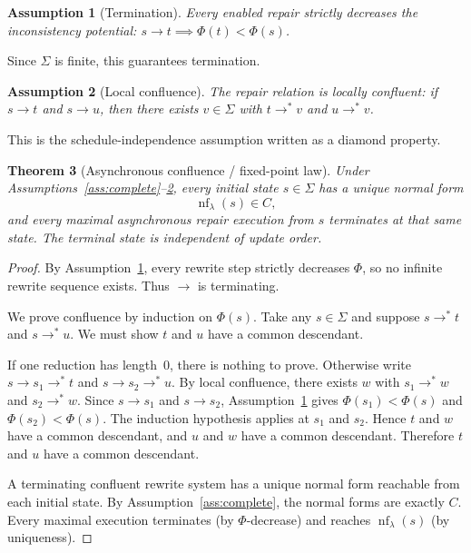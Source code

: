 \documentclass[11pt]{article}
\newtheorem{theorem}{Theorem}[section]
\newtheorem{assumption}[theorem]{Assumption}
\begin{document}
\begin{assumption}[Termination]\label{ass:termination}
Every enabled repair strictly decreases the inconsistency potential: $s\to t \implies \Phi(t)<\Phi(s)$.
\end{assumption}

Since $\Sigma$ is finite, this guarantees termination.

\begin{assumption}[Local confluence]\label{ass:confluence}
The repair relation is locally confluent: if $s\to t$ and $s\to u$, then there exists $v\in\Sigma$ with $t\to^* v$ and $u\to^* v$.
\end{assumption}

This is the schedule-independence assumption written as a diamond property.

\begin{theorem}[Asynchronous confluence / fixed-point law]\label{thm:confluence}
Under Assumptions~\ref{ass:complete}--\ref{ass:confluence}, every initial state $s\in\Sigma$ has a unique normal form
\[
\operatorname{nf}_\lambda(s)\in C,
\]
and every maximal asynchronous repair execution from $s$ terminates at that same state. The terminal state is independent of update order.
\end{theorem}

\begin{proof}
By Assumption~\ref{ass:termination}, every rewrite step strictly decreases $\Phi$, so no infinite rewrite sequence exists. Thus $\to$ is terminating.

We prove confluence by induction on $\Phi(s)$. Take any $s\in\Sigma$ and suppose $s\to^* t$ and $s\to^* u$. We must show $t$ and $u$ have a common descendant.

If one reduction has length~0, there is nothing to prove. Otherwise write $s\to s_1\to^* t$ and $s\to s_2\to^* u$. By local confluence, there exists $w$ with $s_1\to^* w$ and $s_2\to^* w$. Since $s\to s_1$ and $s\to s_2$, Assumption~\ref{ass:termination} gives $\Phi(s_1)<\Phi(s)$ and $\Phi(s_2)<\Phi(s)$. The induction hypothesis applies at $s_1$ and $s_2$. Hence $t$ and $w$ have a common descendant, and $u$ and $w$ have a common descendant. Therefore $t$ and $u$ have a common descendant.

A terminating confluent rewrite system has a unique normal form reachable from each initial state. By Assumption~\ref{ass:complete}, the normal forms are exactly $C$. Every maximal execution terminates (by $\Phi$-decrease) and reaches $\operatorname{nf}_\lambda(s)$ (by uniqueness).
\end{proof}
\end{document}
